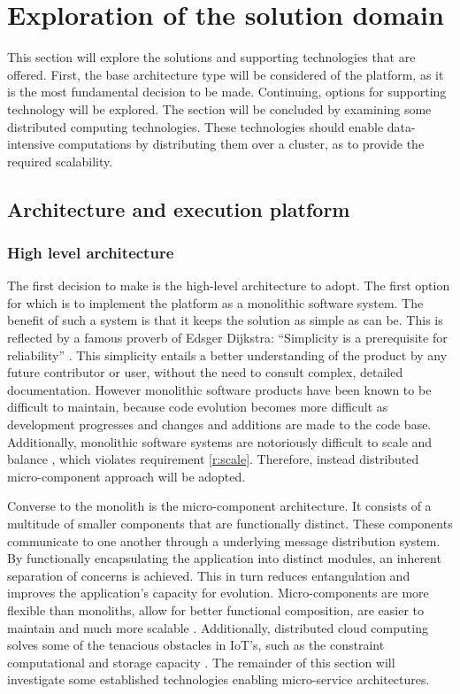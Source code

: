 \section{Exploration of the solution domain}
This section will explore the solutions and supporting technologies that are offered. First, the  base architecture type will be considered of the platform, as it is the most fundamental decision to be made. Continuing, options for supporting technology will be explored. The section will be concluded by examining some distributed computing technologies. These technologies should enable data-intensive computations by distributing them over a cluster, as to provide the required scalability.
\subsection{Architecture and execution platform}
\subsubsection*{High level architecture}
The first decision to make is the high-level architecture to adopt. The first option for which is to implement the platform as a monolithic software system. The benefit of such a system is that it keeps the solution as simple as can be. This is reflected by a famous proverb of Edsger Dijkstra: ``Simplicity is a prerequisite for reliability'' \cite{dijkstra}. This simplicity entails a better understanding of the product by any future contributor or user, without the need to consult complex, detailed documentation. However monolithic software products have been known to be difficult to maintain, because code evolution becomes more difficult as development progresses and changes and additions are made to the code base. Additionally, monolithic software systems are notoriously difficult to scale and balance \cite{mono_vs_micro}, which violates requirement \ref{r:scale}. Therefore, instead distributed micro-component approach will be adopted.

Converse to the monolith is the micro-component architecture. It consists of a multitude of smaller components that are functionally distinct. These components communicate to one another through a underlying message distribution system. By functionally encapsulating the application into distinct modules, an inherent separation of concerns is achieved. This in turn reduces entangulation and improves the application's capacity for evolution. Micro-components are  more flexible than monoliths, allow for better functional composition, are easier to maintain and much more scalable \cite{mono_vs_micro}. Additionally, distributed cloud computing solves some of the tenacious obstacles in IoT's, such as the constraint computational and storage capacity \cite{benefits_cloud_to_iot}. The remainder of this section will investigate some established technologies enabling micro-service architectures.


